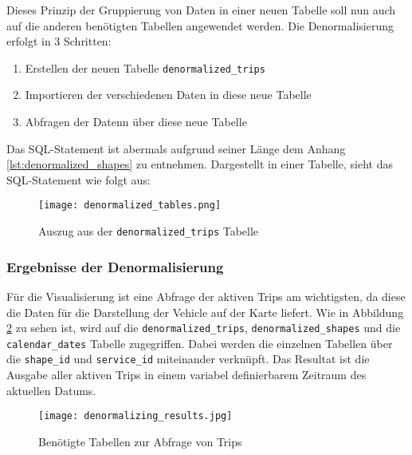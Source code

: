     Dieses Prinzip der Gruppierung von Daten in einer neuen Tabelle soll nun auch auf die anderen benötigten Tabellen angewendet werden. Die Denormalisierung erfolgt in 3 Schritten:

    \begin{enumerate}
      \item Erstellen der neuen Tabelle \texttt{denormalized\_trips}
      \item Importieren der verschiedenen Daten in diese neue Tabelle
      \item Abfragen der Datenn über diese neue Tabelle
    \end{enumerate}

    Das SQL-Statement ist abermals aufgrund seiner Länge dem Anhang \ref{lst:denormalized_shapes} zu entnehmen. Dargestellt in einer Tabelle, sieht das SQL-Statement wie folgt aus:

    \begin{figure}[htbp]
      \begin{center}
        \texttt{[image: denormalized\_tables.png]}
        \caption{Auszug aus der \texttt{denormalized\_trips} Tabelle}
        \label{fig:denormalized_table}
      \end{center}
    \end{figure}  

    \subsubsection*{Ergebnisse der Denormalisierung}
    \label{ssub:ergebnisse_der_denormalisierung}
      Für die Visualisierung ist eine Abfrage der aktiven Trips am wichtigsten, da diese die Daten für die Darstellung der Vehicle auf der Karte liefert. Wie in Abbildung \ref{fig:denormalizing_results} zu sehen ist, wird auf die \texttt{denormalized\_trips}, \texttt{denormalized\_shapes} und die \texttt{calendar\_dates} Tabelle zugegriffen. Dabei werden die einzelnen Tabellen über die \texttt{shape\_id} und \texttt{service\_id} miteinander verknüpft. Das Resultat ist die Ausgabe aller aktiven Trips in einem variabel definierbarem Zeitraum des aktuellen Datums.

      \begin{figure}[htbp]
        \begin{center}
          \texttt{[image: denormalizing\_results.jpg]}
          \caption{Benötigte Tabellen zur Abfrage von Trips}
          \label{fig:denormalizing_results}
        \end{center}
      \end{figure} 

